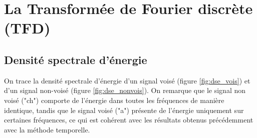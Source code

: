 \documentclass[french]{article}
\begin{document}
\FloatBarrier
\section{La Transformée de Fourier discrète (TFD)}

\subsection{Densité spectrale d'énergie}
On trace la densité spectrale d'énergie d'un signal voisé (figure \ref{fig:dse_vois}) et d'un signal non-voisé (figure \ref{fig:dse_nonvois}). On remarque que le signal non voisé ("ch") comporte de l'énergie dans toutes les fréquences de manière identique, tandis que le signal voisé ("a") présente de l'énergie uniquement sur certaines fréquences, ce qui est cohérent avec les résultats obtenus précédemment avec la méthode temporelle.
\end{document}

